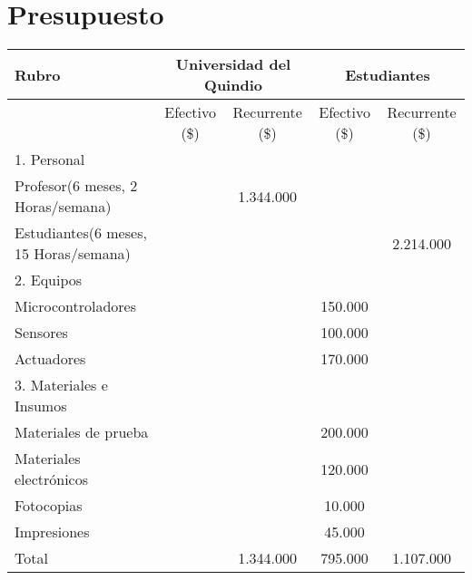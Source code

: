 \chapter{Presupuesto}

\begin{tabular}{|p{4cm}|c|c|c|c|}
	\hline 
	Rubro & \multicolumn{2}{c|}{Universidad del Quindio} & \multicolumn{2}{c|}{Estudiantes}  \\ 
	\hline 
	& Efectivo (\$) & Recurrente (\$) & Efectivo (\$) & Recurrente (\$) \\ 
	\hline 
	1. Personal &  &  &  &  \\ 
	\hline 
	Profesor(6 meses, 2 Horas/semana) &  & 1.344.000 &  &  \\ 
	\hline 
	Estudiantes(6 meses, 15 Horas/semana)&  &  &  & 2.214.000 \\ 
	\hline 
	2. Equipos &  &  &  &  \\ 
	\hline 
	Microcontroladores &  &  & 150.000 &  \\ 
	\hline 
	Sensores &  &  & 100.000 &  \\ 
	\hline 
	Actuadores &  &  & 170.000 &  \\ 
	\hline 
	3. Materiales e Insumos &  &  &  &  \\ 
	\hline
	Materiales de prueba & & & 200.000 & \\
	\hline
	Materiales electrónicos & & & 120.000 & \\
	\hline
	Fotocopias &  &  & 10.000 &  \\ 
	\hline 
	Impresiones &  &  & 45.000 &  \\ 
	\hline 
	Total &  & 1.344.000 & 795.000 & 1.107.000 \\ 
	\hline 
\end{tabular} 

